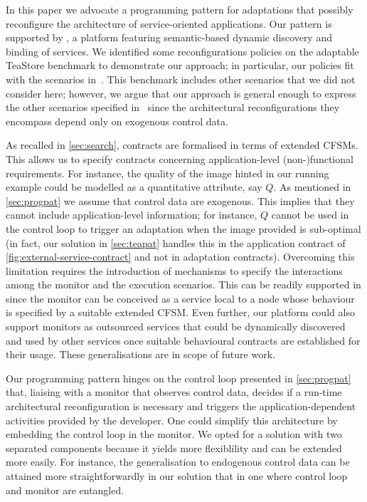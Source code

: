 In this paper we advocate a programming pattern for adaptations that
possibly reconfigure the architecture of service-oriented
applications.
%
Our pattern is supported by \SEArch, a platform featuring
semantic-based dynamic discovery and binding of services.
%
We identified some reconfigurations policies on the adaptable TeaStore
benchmark to demonstrate our approach; in particular, our policies fit
with the scenarios in~\cite[Sections 3.2.3 and
3.2.4]{bliudze:arXiv-2412.16060}.
%
This benchmark includes other scenarios that we did not consider here;
however, we argue that our approach is general enough to express the
other scenarios specified in~\cite{bliudze:arXiv-2412.16060} since the
architectural reconfigurations they encompass depend only on exogenous
control data.

As recalled in \cref{sec:search}, \SEArch contracts are formalised
in terms of extended CFSMs.
%
This allows us to specify contracts concerning application-level
(non-)functional requirements.
%
For instance, the quality of the image hinted in our running example
could be modelled as a quantitative attribute, say $Q$.
%
As mentioned in \cref{sec:progpat} we assume that control data are
exogenous.
%
This implies that they cannot include application-level information;
for instance, $Q$ cannot be used in the control loop to trigger an
adaptation when the image provided is sub-optimal (in fact, our
solution in \cref{sec:teapat} handles this in the application contract
of \cref{fig:external-service-contract} and not in adaptation
contracts).
%
Overcoming this limitation requires the introduction of mechanisms to
specify the interactions among the monitor and the execution
scenarios.
%
This can be readily supported in \SEArch since the monitor can be
conceived as a service local to a node whose behaviour is specified by
a suitable extended CFSM.
%
Even further, our platform could also support  monitors  as outsourced services
that could be dynamically discovered and used by other services once
suitable behavioural contracts are established for their usage.
%
These generalisations are in scope of future work.

Our programming pattern hinges on the control loop presented in
\cref{sec:progpat} that, liaising with a monitor that observes control
data, decides if a run-time architectural reconfiguration is necessary
and triggers the application-dependent activities provided by the
developer.
%
One could simplify this architecture by embedding the  control loop
in the monitor.
% 
We opted for a solution with two separated components because it
yields more flexiblility and can be extended more easily.
%
For instance, the generalisation to endogenous control data can be
attained more straightforwardly in our solution that in one where
control loop and monitor are entangled.

